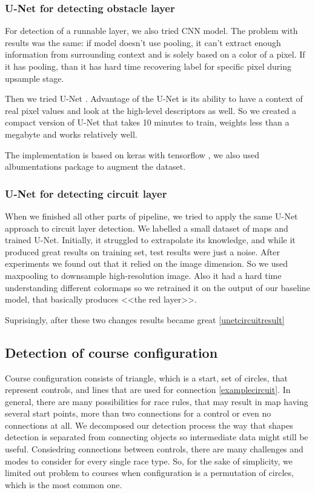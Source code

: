 \documentclass[a4paper,12pt]{extarticle}
\begin{document}
\subsubsection{U-Net for detecting obstacle layer}

For detection of a runnable layer, we also tried CNN model.
The problem with results was the same: if model doesn't use pooling, it can't extract enough information from surrounding context and is solely based on a color of a pixel.
If it has pooling, than it has hard time recovering label for specific pixel during upsample stage.

Then we tried U-Net \cite{UNet}. Advantage of the U-Net is its ability to have a context of real pixel values and look at the high-level descriptors as well.
So we created a compact version of U-Net that takes 10 minutes to train, weights less than a megabyte and works relatively well.

The implementation is based on keras with tensorflow \cite{keras}, we also used albumentations \cite{albumentations} package to augment the dataset.

\subsubsection{U-Net for detecting circuit layer}

When we finished all other parts of pipeline, we tried to apply the same U-Net approach to circuit layer detection.
We labelled a small dataset of maps and trained U-Net.
Initially, it struggled to extrapolate its knowledge, and while it produced great results on training set, test results were just a noise.
After experiments we found out that it relied on the image dimension. So we used maxpooling to downsample high-resolution image.
Also it had a hard time understanding different colormaps so we retrained it on the output of our baseline model, that basically produces <<the red layer>>. 

Suprisingly, after these two changes results became great \ref{unetcircuitresult}

\subsection{Detection of course configuration}

Course configuration consists of triangle, which is a start, set of circles, that represent controls, and lines that are used for connection \ref{examplecircuit}.
In general, there are many possibilities for race rules, that may result in map having several start points, more than two connections for a control or even no connections at all.
We decomposed our detection process the way that shapes detection is separated from connecting objects so intermediate data might still be useful.
Consiedring connections between controls, there are many challenges and modes to consider for every single race type.
So, for the sake of simplicity, we limited out problem to courses when  configuration is a permutation of circles, which is the most common one.
\end{document}
